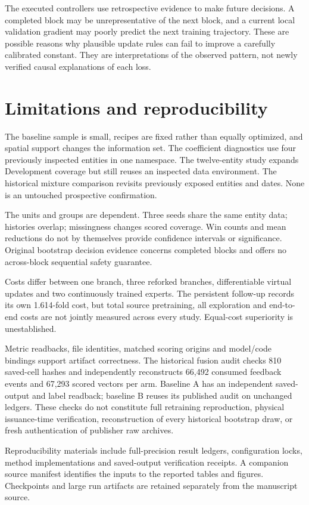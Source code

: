 \documentclass[pdflatex,iicol,sn-mathphys-num]{sn-jnl}
\begin{document}
The executed controllers use retrospective evidence to make future decisions. A completed block may be unrepresentative of the next block, and a current local validation gradient may poorly predict the next training trajectory. These are possible reasons why plausible update rules can fail to improve a carefully calibrated constant. They are interpretations of the observed pattern, not newly verified causal explanations of each loss.

\section{Limitations and reproducibility}
The baseline sample is small, recipes are fixed rather than equally optimized, and spatial support changes the information set. The coefficient diagnostics use four previously inspected entities in one namespace. The twelve-entity study expands Development coverage but still reuses an inspected data environment. The historical mixture comparison revisits previously exposed entities and dates. None is an untouched prospective confirmation.

The units and groups are dependent. Three seeds share the same entity data; histories overlap; missingness changes scored coverage. Win counts and mean reductions do not by themselves provide confidence intervals or significance. Original bootstrap decision evidence concerns completed blocks and offers no across-block sequential safety guarantee.

Costs differ between one branch, three reforked branches, differentiable virtual updates and two continuously trained experts. The persistent follow-up records its own 1.614-fold cost, but total source pretraining, all exploration and end-to-end costs are not jointly measured across every study. Equal-cost superiority is unestablished.

Metric readbacks, file identities, matched scoring origins and model/code bindings support artifact correctness. The historical fusion audit checks 810 saved-cell hashes and independently reconstructs 66,492 consumed feedback events and 67,293 scored vectors per arm. Baseline A has an independent saved-output and label readback; baseline B reuses its published audit on unchanged ledgers. These checks do not constitute full retraining reproduction, physical issuance-time verification, reconstruction of every historical bootstrap draw, or fresh authentication of publisher raw archives.

Reproducibility materials include full-precision result ledgers, configuration locks, method implementations and saved-output verification receipts. A companion source manifest identifies the inputs to the reported tables and figures. Checkpoints and large run artifacts are retained separately from the manuscript source.
\end{document}
